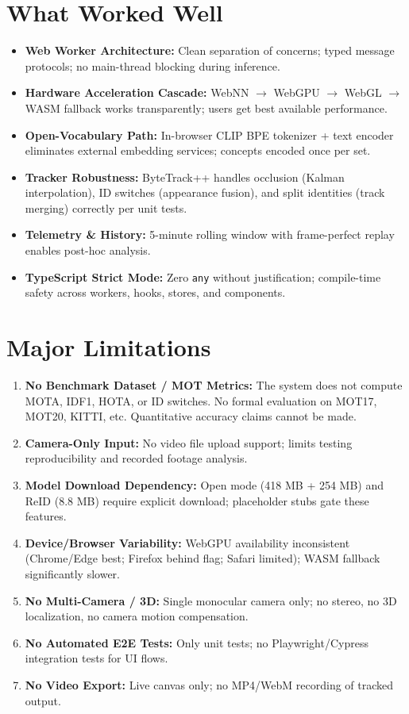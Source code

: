 \section{What Worked Well}
\label{sec:worked-well}

\begin{itemize}
    \item \textbf{Web Worker Architecture:} Clean separation of concerns; typed message protocols; no main-thread blocking during inference.
    \item \textbf{Hardware Acceleration Cascade:} WebNN $\to$ WebGPU $\to$ WebGL $\to$ WASM fallback works transparently; users get best available performance.
    \item \textbf{Open-Vocabulary Path:} In-browser CLIP BPE tokenizer + text encoder eliminates external embedding services; concepts encoded once per set.
    \item \textbf{Tracker Robustness:} ByteTrack++ handles occlusion (Kalman interpolation), ID switches (appearance fusion), and split identities (track merging) correctly per unit tests.
    \item \textbf{Telemetry \& History:} 5-minute rolling window with frame-perfect replay enables post-hoc analysis.
    \item \textbf{TypeScript Strict Mode:} Zero \texttt{any} without justification; compile-time safety across workers, hooks, stores, and components.
\end{itemize}

\section{Major Limitations}
\label{sec:limitations}

\begin{enumerate}
    \item \textbf{No Benchmark Dataset / MOT Metrics:} The system does not compute MOTA, IDF1, HOTA, or ID switches. No formal evaluation on MOT17, MOT20, KITTI, etc. Quantitative accuracy claims cannot be made.
    \item \textbf{Camera-Only Input:} No video file upload support; limits testing reproducibility and recorded footage analysis.
    \item \textbf{Model Download Dependency:} Open mode (418 MB + 254 MB) and ReID (8.8 MB) require explicit download; placeholder stubs gate these features.
    \item \textbf{Device/Browser Variability:} WebGPU availability inconsistent (Chrome/Edge best; Firefox behind flag; Safari limited); WASM fallback significantly slower.
    \item \textbf{No Multi-Camera / 3D:} Single monocular camera only; no stereo, no 3D localization, no camera motion compensation.
    \item \textbf{No Automated E2E Tests:} Only unit tests; no Playwright/Cypress integration tests for UI flows.
    \item \textbf{No Video Export:} Live canvas only; no MP4/WebM recording of tracked output.
\end{enumerate}

